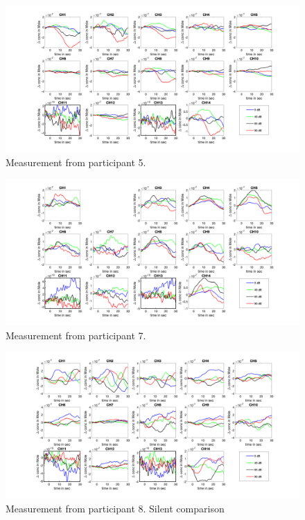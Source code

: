 \begin{figure}[H]
  \centering
    \includegraphics[scale=.4]{bilder/HbR_Mole/sub_lukas_s_HbR.png}
  \caption{Measurement from participant 5.}
  \label{fig:somesignal}
\end{figure}

\begin{figure}[H]
  \centering
    \includegraphics[scale=.4]{bilder/HbR_Mole/sub_liao_s_HbR.png}
  \caption{Measurement from participant 7.}
  \label{fig:somesignal}
\end{figure}


\begin{figure}[H]
  \centering
    \includegraphics[scale=.4]{bilder/HbR_Mole/sub_luca2_s_HbR.png}
  \caption{Measurement from participant 8. Silent comparison}
  \label{fig:somesignal}
\end{figure}





